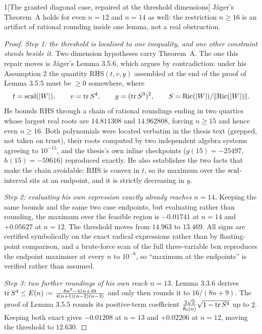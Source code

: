 \begin{Lem}{1}[The granted diagonal case, repaired at the threshold dimensions]
J\"ager's Theorem~A holds for even $n=12$ and $n=14$ as well: the restriction $n\ge16$ is an artifact of rational rounding inside one lemma, not a real obstruction.
\end{Lem}

\begin{proof}
\emph{Step 1: the threshold is localised to one inequality, and one other constraint stands beside it.} Two dimension hypotheses carry Theorem~A. The one this repair moves is J\"ager's Lemma 3.5.6, which argues by contradiction: under his Assumption 2 the quantity $\mathrm{RHS}(t,v,y)$ assembled at the end of the proof of Lemma 3.5.5 must be $\ge0$ somewhere, where
\[
t=\mathrm{scal}(|W|),\qquad v=\operatorname{tr} S^4,\qquad y=(\operatorname{tr} S^3)^2,\qquad S=\mathrm{Ric}(|W|)/\|\mathrm{Ric}(|W|)\| .
\]
He bounds $\mathrm{RHS}$ through a chain of rational roundings ending in two quartics whose largest real roots are $14.811308$ and $14.962808$, forcing $n\ge15$ and hence even $n\ge16$. Both polynomials were located verbatim in the thesis text (grepped, not taken on trust), their roots computed by two independent algebra systems agreeing to $10^{-15}$, and the thesis's own inline checkpoints ($g(15)=-25497$, $h(15)=-59616$) reproduced exactly. He also establishes the two facts that make the chain avoidable: $\mathrm{RHS}$ is convex in $t$, so its maximum over the $\mathrm{scal}$-interval sits at an endpoint, and it is strictly decreasing in $y$.

\emph{Step 2: evaluating his own expression exactly already reaches $n=14$.} Keeping the same bounds and the same two case endpoints, but evaluating rather than rounding, the maximum over the feasible region is $-0.01741$ at $n=14$ and $+0.05627$ at $n=12$. The threshold moves from $14.963$ to $13.469$. All signs are certified symbolically on the exact radical expressions rather than by floating-point comparison, and a brute-force scan of the full three-variable box reproduces the endpoint maximiser at every $n$ to $10^{-8}$, so ``maximum at the endpoints'' is verified rather than assumed.

\emph{Step 3: two further roundings of his own reach $n=13$.} Lemma 3.3.6 derives $\operatorname{tr} S^4\le E(n):=\frac{8n^2-41n+49}{4(n+1)(n-2)(n-3)}$ and only then rounds it to $16/(8n+9)$. The proof of Lemma 3.5.5 rounds its positive-term coefficient $\frac{2\sqrt2}{\hat\theta_0(n)}\sqrt{1-\operatorname{tr} S^4}$ up to $2$. Keeping both exact gives $-0.01208$ at $n=13$ and $+0.02206$ at $n=12$, moving the threshold to $12.630$.


\end{proof}
